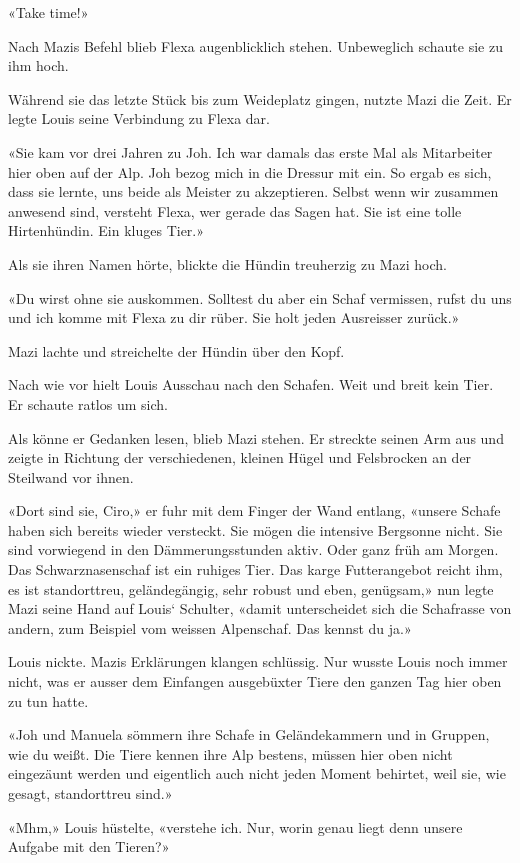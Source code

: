 «Take time!»

Nach Mazis Befehl blieb Flexa augenblicklich stehen. Unbeweglich schaute
sie zu ihm hoch.

Während sie das letzte Stück bis zum Weideplatz gingen, nutzte Mazi die
Zeit. Er legte Louis seine Verbindung zu Flexa dar.

«Sie kam vor drei Jahren zu Joh. Ich war damals das erste Mal als
Mitarbeiter hier oben auf der Alp. Joh bezog mich in die Dressur mit
ein. So ergab es sich, dass sie lernte, uns beide als Meister zu
akzeptieren. Selbst wenn wir zusammen anwesend sind, versteht Flexa, wer
gerade das Sagen hat. Sie ist eine tolle Hirtenhündin. Ein kluges Tier.»

Als sie ihren Namen hörte, blickte die Hündin treuherzig zu Mazi hoch.

«Du wirst ohne sie auskommen. Solltest du aber ein Schaf vermissen,
rufst du uns und ich komme mit Flexa zu dir rüber. Sie holt jeden
Ausreisser zurück.»

Mazi lachte und streichelte der Hündin über den Kopf.

Nach wie vor hielt Louis Ausschau nach den Schafen. Weit und breit kein
Tier. Er schaute ratlos um sich.

Als könne er Gedanken lesen, blieb Mazi stehen. Er streckte seinen Arm
aus und zeigte in Richtung der verschiedenen, kleinen Hügel und
Felsbrocken an der Steilwand vor ihnen.

«Dort sind sie, Ciro,» er fuhr mit dem Finger der Wand entlang, «unsere
Schafe haben sich bereits wieder versteckt. Sie mögen die intensive
Bergsonne nicht. Sie sind vorwiegend in den Dämmerungsstunden aktiv.
Oder ganz früh am Morgen. Das Schwarznasenschaf ist ein ruhiges Tier.
Das karge Futterangebot reicht ihm, es ist standorttreu, geländegängig,
sehr robust und eben, genügsam,» nun legte Mazi seine Hand auf Louis`
Schulter, «damit unterscheidet sich die Schafrasse von andern, zum
Beispiel vom weissen Alpenschaf. Das kennst du ja.»

Louis nickte. Mazis Erklärungen klangen schlüssig. Nur wusste Louis noch
immer nicht, was er ausser dem Einfangen ausgebüxter Tiere den ganzen
Tag hier oben zu tun hatte.

«Joh und Manuela sömmern ihre Schafe in Geländekammern und in Gruppen,
wie du weißt. Die Tiere kennen ihre Alp bestens, müssen hier oben nicht
eingezäunt werden und eigentlich auch nicht jeden Moment behirtet, weil
sie, wie gesagt, standorttreu sind.»

«Mhm,» Louis hüstelte, «verstehe ich. Nur, worin genau liegt denn unsere
Aufgabe mit den Tieren?»

